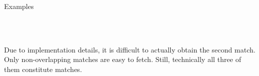 \begin{frame}[fragile]{Examples}
%
\begin{tcbraster}[raster columns=2,
                  raster equal height,
                  nobeforeafter,
                  raster column skip=0.1cm]
\begin{codebox}[Pattern]
\end{codebox}
%
\begin{codebox}[Matches]
\end{codebox}
\end{tcbraster}
%
\vspace{-9pt}
\begin{tcbraster}[raster columns=2,
                  raster equal height,
                  nobeforeafter,
                  raster column skip=0.1cm]
\begin{codebox}[Pattern]
\end{codebox}
%
\begin{codebox}[Matches]
\\
\\
\end{codebox}
\end{tcbraster}
%
\vspace{-9pt}
\begin{hintbox}
\footnotesize
Due to implementation details, it is difficult to actually obtain the second match. Only non-overlapping matches are easy to fetch. Still, technically all three of them constitute matches.
\end{hintbox}
%
\end{frame}


